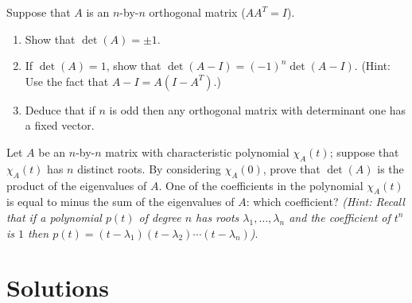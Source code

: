 \documentclass{article}
\begin{document}
\begin{Exercise}\label{exr:orthaxis}
Suppose that \(A\) is an \(n\)-by-\(n\) orthogonal matrix
(\(AA^T=I\)).
\begin{enumerate}
\item Show that \(\det(A)=\pm 1\).
\item If \(\det(A)=1\), show that \(\det(A-I)=(-1)^n\det(A-I)\). (Hint:
Use the fact that \(A-I=A(I-A^T)\).)
\item Deduce that if \(n\) is odd then any orthogonal matrix with
determinant one has a fixed vector.


\end{enumerate}
\end{Exercise}
\begin{Exercise}\label{exr:detprod}
Let \(A\) be an \(n\)-by-\(n\) matrix with characteristic polynomial
\(\chi_A(t)\); suppose that \(\chi_A(t)\) has \(n\) distinct
roots. By considering \(\chi_A(0)\), prove that \(\det(A)\) is the
product of the eigenvalues of \(A\). One of the coefficients in the
polynomial \(\chi_A(t)\) is equal to minus the sum of the
eigenvalues of \(A\): which coefficient? {\em (Hint: Recall that if
a polynomial \(p(t)\) of degree \(n\) has roots
\(\lambda_1,\ldots,\lambda_n\) and the coefficient of \(t^n\) is
\(1\) then \(p(t)=(t-\lambda_1)(t-\lambda_2)\cdots(t-\lambda_n)\))}.


\end{Exercise}
\newpage
\setcounter{section}{3}
\section{Solutions}
\end{document}
